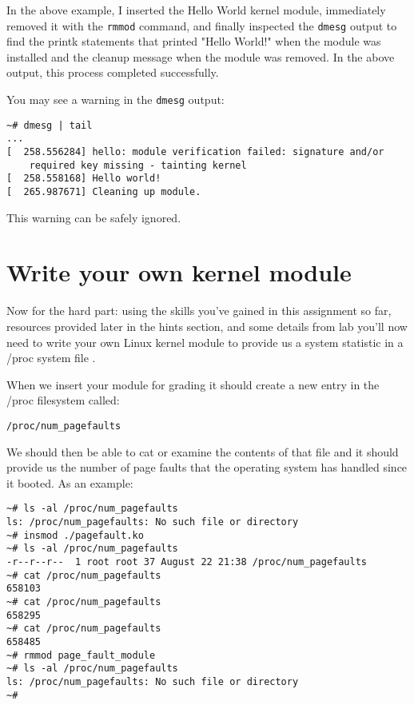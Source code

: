 \documentclass[11pt]{article}
\begin{document}
In the above example, I inserted the Hello World kernel module, immediately removed it with the \texttt {rmmod} command, and finally inspected the \texttt{dmesg} output to find the printk statements that printed "Hello World!" when the module was installed and the cleanup message when the module was removed. In the above output, this process completed successfully.

You may see a warning in the \texttt{dmesg} output:

\begin{verbatim}
~# dmesg | tail
...
[  258.556284] hello: module verification failed: signature and/or  
	required key missing - tainting kernel
[  258.558168] Hello world!
[  265.987671] Cleaning up module.
\end{verbatim}

This warning can be safely ignored.

\section*{Write your own kernel module}

Now for the hard part: using the skills you've gained in this assignment so far, resources provided later in the hints section, and some details from lab you'll now need to write your own Linux kernel module to provide us a system statistic in a /proc system file \cite{cse551}. 

When we insert your module for grading it should create a new entry in the /proc filesystem called:

\begin{verbatim}
/proc/num_pagefaults
\end{verbatim}

\newpage

We should then be able to cat or examine the contents of that file and it should provide us the number of page faults that the operating system has handled since it booted. As an example:

\begin{verbatim}
~# ls -al /proc/num_pagefaults
ls: /proc/num_pagefaults: No such file or directory
~# insmod ./pagefault.ko 
~# ls -al /proc/num_pagefaults
-r--r--r--  1 root root 37 August 22 21:38 /proc/num_pagefaults
~# cat /proc/num_pagefaults 
658103
~# cat /proc/num_pagefaults 
658295
~# cat /proc/num_pagefaults 
658485
~# rmmod page_fault_module
~# ls -al /proc/num_pagefaults
ls: /proc/num_pagefaults: No such file or directory
~#
\end{verbatim}
\end{document}
